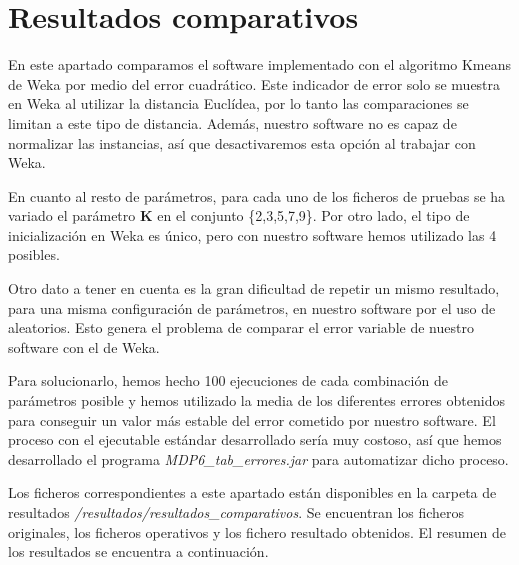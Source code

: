 \documentclass[a4paper]{report}
\begin{document}
	\section{Resultados comparativos}
	\label{rescomparativos}
	En este apartado comparamos el software implementado con el algoritmo Kmeans de Weka por medio del error cuadrático. Este indicador de error solo se muestra en Weka al utilizar la distancia Euclídea, por lo tanto las comparaciones se limitan a este tipo de distancia. Además, nuestro software no es capaz de normalizar las instancias, así que desactivaremos esta opción al trabajar con Weka.
	
	En cuanto al resto de parámetros, para cada uno de los ficheros de pruebas se ha variado el parámetro \textbf{K} en el conjunto \{2,3,5,7,9\}. Por otro lado, el tipo de inicialización en Weka es único, pero con nuestro software hemos utilizado las 4 posibles.
	
	Otro dato a tener en cuenta es la gran dificultad de repetir un mismo resultado, para una misma configuración de parámetros, en nuestro software por el uso de aleatorios. Esto genera el problema de comparar el error variable de nuestro software con el de Weka.
	
	Para solucionarlo, hemos hecho 100 ejecuciones de cada combinación de parámetros posible y hemos utilizado la media de los diferentes errores obtenidos para conseguir un valor más estable del error cometido por nuestro software. El proceso con el ejecutable estándar desarrollado sería muy costoso, así que hemos desarrollado el programa \textit{MDP6\_tab\_errores.jar} para automatizar dicho proceso.
	
	Los ficheros correspondientes a este apartado están disponibles en la carpeta de resultados  \textit{/resultados/resultados\_comparativos}. Se encuentran los ficheros originales, los ficheros operativos y los fichero resultado obtenidos. El resumen de los resultados se encuentra a continuación.
	
\end{document}
